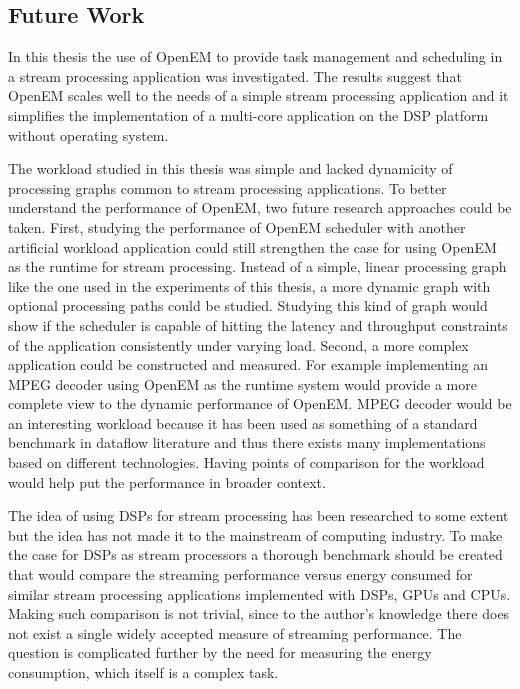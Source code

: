 \subsection{Future Work}
\label{subsec:future-work}
In this thesis the use of OpenEM to provide task management and scheduling in a stream processing application was investigated. The results suggest that OpenEM scales well to the needs of a simple stream processing application and it simplifies the implementation of a multi-core application on the DSP platform without operating system.

The workload studied in this thesis was simple and lacked dynamicity of processing graphs common to stream processing applications. To better understand the performance of OpenEM, two future research approaches could be taken. First, studying the performance of OpenEM scheduler with another artificial workload application could still strengthen the case for using OpenEM as the runtime for stream processing. Instead of a simple, linear processing graph like the one used in the experiments of this thesis, a more dynamic graph with optional processing paths could be studied. Studying this kind of graph would show if the scheduler is capable of hitting the latency and throughput constraints of the application consistently under varying load. Second, a more complex application could be constructed and measured. For example implementing an MPEG decoder using OpenEM as the runtime system would provide a more complete view to the dynamic performance of OpenEM. MPEG decoder would be an interesting workload because it has been used as something of a standard benchmark in dataflow literature and thus there exists many implementations based on different technologies. Having points of comparison for the workload would help put the performance in broader context.

The idea of using DSPs for stream processing has been researched to some extent but the idea has not made it to the mainstream of computing industry. To make the case for DSPs as stream processors a thorough benchmark should be created that would compare the streaming performance versus energy consumed for similar stream processing applications implemented with DSPs, GPUs and CPUs. Making such comparison is not trivial, since to the author's knowledge there does not exist a single widely accepted measure of streaming performance. The question is complicated further by the need for measuring the energy consumption, which itself is a complex task.

